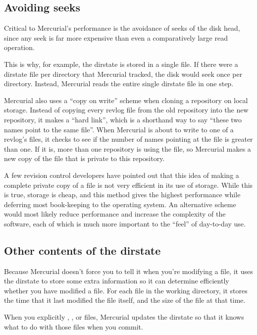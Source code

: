 \subsection{Avoiding seeks}

Critical to Mercurial's performance is the avoidance of seeks of the
disk head, since any seek is far more expensive than even a
comparatively large read operation.

This is why, for example, the dirstate is stored in a single file.  If
there were a dirstate file per directory that Mercurial tracked, the
disk would seek once per directory.  Instead, Mercurial reads the
entire single dirstate file in one step.

Mercurial also uses a ``copy on write'' scheme when cloning a
repository on local storage.  Instead of copying every revlog file
from the old repository into the new repository, it makes a ``hard
link'', which is a shorthand way to say ``these two names point to the
same file''.  When Mercurial is about to write to one of a revlog's
files, it checks to see if the number of names pointing at the file is
greater than one.  If it is, more than one repository is using the
file, so Mercurial makes a new copy of the file that is private to
this repository.

A few revision control developers have pointed out that this idea of
making a complete private copy of a file is not very efficient in its
use of storage.  While this is true, storage is cheap, and this method
gives the highest performance while deferring most book-keeping to the
operating system.  An alternative scheme would most likely reduce
performance and increase the complexity of the software, each of which
is much more important to the ``feel'' of day-to-day use.

\subsection{Other contents of the dirstate}

Because Mercurial doesn't force you to tell it when you're modifying a
file, it uses the dirstate to store some extra information so it can
determine efficiently whether you have modified a file.  For each file
in the working directory, it stores the time that it last modified the
file itself, and the size of the file at that time.  

When you explicitly , ,  or
 files, Mercurial updates the dirstate so that it knows
what to do with those files when you commit.

